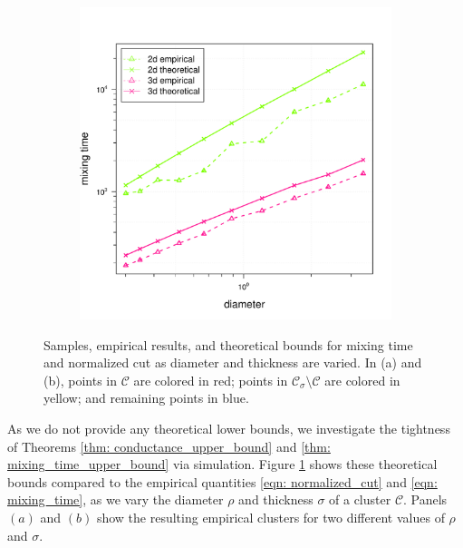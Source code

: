 \documentclass{article}
\newcommand{\1}{\mathbf{1}}
\newcommand{\Cset}{\mathcal{C}}
\newcommand{\Csig}{\Cset_{\sigma}}
\theoremstyle{aldenthm}
\theoremstyle{aldenrmrk}
\begin{document}
\begin{figure}
\begin{adjustbox}{minipage=\linewidth}
\begin{subfigure}{.33\linewidth}
			\caption{}
		\end{subfigure}
		\begin{subfigure}{.33\linewidth}
			\includegraphics[width=\linewidth]{example1plots/diameter_mixing_time_plot}
			\caption{}
		\end{subfigure}
		\caption{Samples, empirical results, and theoretical bounds for mixing time and normalized cut as diameter and thickness are varied. In (a) and (b), points in $\Cset$ are colored in red; points in $\Csig \setminus \Cset$ are colored in yellow; and remaining points in blue.}
		\label{fig:fig1}
	\end{adjustbox}
\end{figure}

As we do not provide any theoretical lower bounds, we investigate the tightness of Theorems \ref{thm: conductance_upper_bound} and \ref{thm: mixing_time_upper_bound} via simulation. Figure \ref{fig:fig1} shows these theoretical bounds compared to the empirical quantities \eqref{eqn: normalized_cut} and \eqref{eqn: mixing_time}, as we vary the diameter $\rho$ and thickness $\sigma$ of a cluster $\Cset$. Panels $(a)$ and $(b)$ show the resulting empirical clusters for two different values of $\rho$ and $\sigma$.
\end{document}
